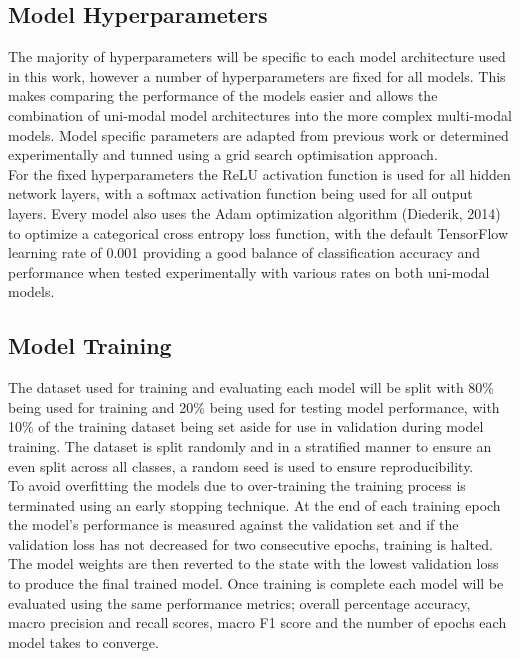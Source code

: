 \documentclass[a4paper,12pt]{article}
\begin{document}
\subsection{Model Hyperparameters}
The majority of hyperparameters will be specific to each model architecture used in this work, however a number of hyperparameters are fixed for all models. This makes comparing the performance of the models easier and allows the combination of uni-modal model architectures into the more complex multi-modal models. Model specific parameters are adapted from previous work or determined experimentally and tunned using a grid search optimisation approach. \\

For the fixed hyperparameters the ReLU activation function is used for all hidden network layers, with a softmax activation function being used for all output layers. Every model also uses the Adam optimization algorithm (Diederik, 2014) to optimize a categorical cross entropy loss function, with the default TensorFlow learning rate of 0.001 providing a good balance of classification accuracy and performance when tested experimentally with various rates on both uni-modal models.\\

\subsection{Model Training}
The dataset used for training and evaluating each model will be split with 80\% being used for training and 20\% being used for testing model performance, with 10\% of the training dataset being set aside for use in validation during model training. The dataset is split randomly and in a stratified manner to ensure an even split across all classes, a random seed is used to ensure reproducibility.\\

To avoid overfitting the models due to over-training the training process is terminated using an early stopping technique. At the end of each training epoch the model's performance is measured against the validation set and if the validation loss has not decreased for two consecutive epochs, training is halted. The model weights are then reverted to the state with the lowest validation loss to produce the final trained model. Once training is complete each model will be evaluated using the same performance metrics; overall percentage accuracy, macro precision and recall scores, macro F1 score and the number of epochs each model takes to converge.
\end{document}
